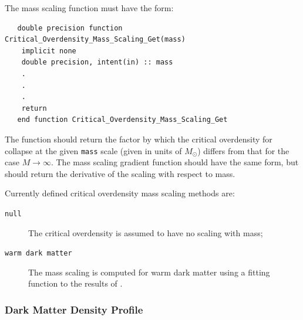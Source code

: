 The mass scaling function must have the form:
\begin{verbatim}
   double precision function Critical_Overdensity_Mass_Scaling_Get(mass)
    implicit none
    double precision, intent(in) :: mass
    .
    .
    .
    return
   end function Critical_Overdensity_Mass_Scaling_Get
\end{verbatim}
The function should return the factor by which the critical overdensity for collapse at the given {\tt mass} scale (given in units of $M_{\odot}$) differs from that for the case $M\rightarrow\infty$. The mass scaling gradient function should have the same form, but should return the derivative of the scaling with respect to mass.

Currently defined critical overdensity mass scaling methods are:
\begin{description}
 \item [{\tt null}] The critical overdensity is assumed to have no scaling with mass;
 \item [{\tt warm dark matter}] The mass scaling is computed for warm dark matter using a fitting function to the results of \cite{barkana_constraints_2001}.
\end{description}

\subsubsection{Dark Matter Density Profile}

